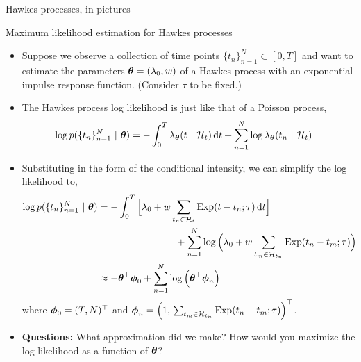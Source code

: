 \documentclass[aspectratio=169]{beamer}
\begin{document}
\begin{frame}{Hawkes processes, in pictures}
    
\end{frame}

\begin{frame}[t, allowframebreaks]{Maximum likelihood estimation for Hawkes processes}
\begin{itemize}
    \itemsep1em
    
    \item Suppose we observe a collection of time points $\{t_n\}_{n=1}^N \subset [0, T]$ and want to estimate the parameters $\boldsymbol{\theta} = (\lambda_0, w)$ of a Hawkes process with an exponential impulse response function. (Consider $\tau$ to be fixed.)
    
    \item The Hawkes process log likelihood is just like that of a Poisson process,
    \begin{align}
        \log p(\{t_n\}_{n=1}^N ~\vert~ \boldsymbol{\theta}) &= -\int_0^T \lambda_{\boldsymbol{\theta}}(t ~\vert~ \mathcal{H}_t) \mathop{}\!\mathrm{d} t + \sum_{n=1}^N \log \lambda_{\boldsymbol{\theta}}(t_n ~\vert~ \mathcal{H}_t)
    \end{align}
    
    \item Substituting in the form of the conditional intensity, we can simplify the log likelihood to,
    \begin{align}
        \nonumber
        \log p(\{t_n\}_{n=1}^N ~\vert~ \boldsymbol{\theta}) &=
        -\int_0^T \Big[\lambda_0 + w\sum_{t_n \in \mathcal{H}_t} \mathrm{Exp}(t-t_n; \tau) \mathop{}\!\mathrm{d} t \Big] \\
        &\hspace{8em}+ \sum_{n=1}^N \log \Big(\lambda_0 + w \sum_{t_m \in \mathcal{H}_{t_n}} \mathrm{Exp}(t_n - t_m; \tau) \Big) \\
        &\approx 
        -\boldsymbol{\theta}^\top \boldsymbol{\phi}_0 + \sum_{n=1}^N \log \Big(\boldsymbol{\theta}^\top \boldsymbol{\phi}_n \Big)
    \end{align}
    where $\boldsymbol{\phi}_0 = (T, N)^\top$ and  $\boldsymbol{\phi}_n = \Big(1, \, \sum_{t_m \in \mathcal{H}_{t_n}} \mathrm{Exp}(t_n - t_m; \tau) \Big)^\top$.
    
    \item \textbf{Questions: } What approximation did we make? How would you maximize the log likelihood as a function of $\boldsymbol{\theta}$?
\end{itemize}
\end{frame}
\end{document}
